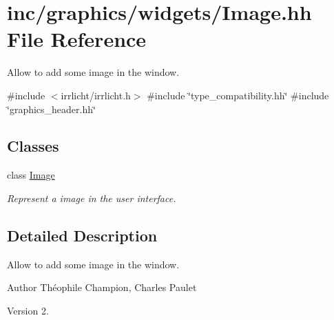 \hypertarget{Image_8hh}{}\section{inc/graphics/widgets/\+Image.hh File Reference}
\label{Image_8hh}


Allow to add some image in the window.  


{\ttfamily \#include $<$irrlicht/irrlicht.\+h$>$}\newline
{\ttfamily \#include \char`\"{}type\+\_\+compatibility.\+hh\char`\"{}}\newline
{\ttfamily \#include \char`\"{}graphics\+\_\+header.\+hh\char`\"{}}\newline
\subsection*{Classes}
\begin{DoxyCompactItemize}
\item 
class \hyperlink{classImage}{Image}
\begin{DoxyCompactList}\small\item\em Represent a image in the user interface. \end{DoxyCompactList}\end{DoxyCompactItemize}


\subsection{Detailed Description}
Allow to add some image in the window. 

\begin{DoxyAuthor}{Author}
Théophile Champion, Charles Paulet 
\end{DoxyAuthor}
\begin{DoxyVersion}{Version}
2. 
\end{DoxyVersion}
